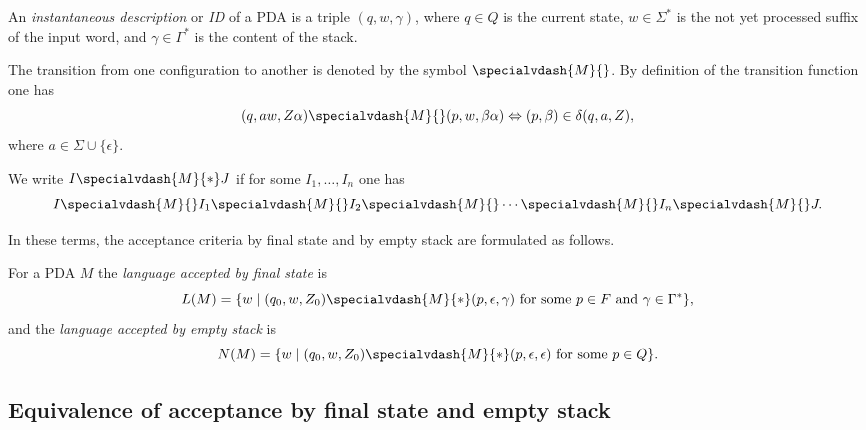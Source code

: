 \begin{page}
\setcounter{section}{6}
\setcounter{subsection}{2}
\setcounter{dfn}{6}
\label{portion:1265}

\begin{dfn}
An \emph{instantaneous description} or \emph{ID} of a PDA is a triple $(q, w, \gamma)$,
where $q \in Q$ is the current state, $w \in \Sigma^*$ is the not yet processed suffix of the input word,
and $\gamma \in \Gamma^*$ is the content of the stack.
\end{dfn}

\end{page}

\begin{page}
\setcounter{section}{6}
\setcounter{subsection}{2}
\setcounter{dfn}{6}
\label{portion:1266}


The transition from one configuration to another is denoted by the symbol $\specialvdash{M}{}$.
By definition of the transition function one has
\[
(q, aw, Z\alpha) \specialvdash{M}{} (p, w, \beta\alpha) \Leftrightarrow (p, \beta) \in \delta(q, a, Z),
\]
where $a \in \Sigma \cup \{\epsilon\}$.

We write $I \specialvdash{M}{*} J$ if for some $I_1, \ldots, I_n$ one has
\[
I \specialvdash{M}{} I_1 \specialvdash{M}{} I_2 \specialvdash{M}{} \cdots \specialvdash{M}{} I_n \specialvdash{M}{} J.
\]

In these terms, the acceptance criteria by final state and by empty stack are formulated as follows.


\end{page}

\begin{page}
\setcounter{section}{6}
\setcounter{subsection}{2}
\setcounter{dfn}{7}
\label{portion:1268}

\begin{dfn}
For a PDA $M$ the \emph{language accepted by final state} is
\[
L(M) = \{w \mid (q_0, w, Z_0) \specialvdash{M}{*} (p, \epsilon, \gamma) \text{ for some }p \in F \text{ and } \gamma \in \Gamma^*\},
\]
and the \emph{language accepted by empty stack} is
\[
N(M) = \{w \mid (q_0, w, Z_0) \specialvdash{M}{*} (p, \epsilon, \epsilon) \text{ for some }p \in Q\}.
\]
\end{dfn}

\end{page}

\begin{page}
\setcounter{section}{6}
\setcounter{subsection}{3}
\setcounter{dfn}{7}
\label{portion:1271}

\subsection{Equivalence of acceptance by final state and empty stack}

\end{page}

